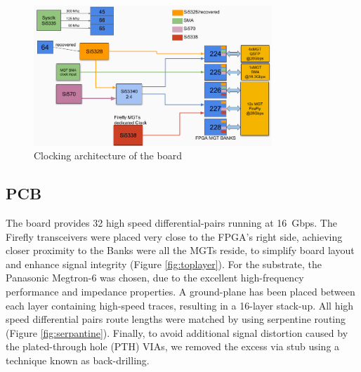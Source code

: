 \documentclass[a4paper]{PoS}
\begin{document}
\begin{figure}[h]
\centering
\includegraphics[width=0.8\textwidth]{clocking.png}
\caption{ Clocking architecture of the board}
\label{clocking}
\end{figure}


\subsection{PCB}
The board provides 32 high speed differential-pairs running at 16~Gbps. The Firefly transceivers were placed very close to the FPGA's right side, achieving closer proximity to the Banks were all the MGTs reside, to simplify board layout and enhance signal integrity (Figure \ref{fig:toplayer}). For the substrate, the Panasonic Megtron-6 was chosen, due to the excellent high-frequency performance and impedance properties. A ground-plane has been placed between each layer containing high-speed traces, resulting in a 16-layer stack-up. All high speed differential pairs route lengths were matched by using serpentine routing (Figure \ref{fig:serpantine}). Finally, to avoid additional signal distortion caused by the plated-through hole (PTH) VIAs, we removed the excess via stub using a technique known as back-drilling.
\end{document}
